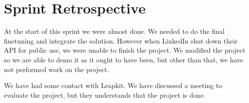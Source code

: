\section{Sprint Retrospective}

At the start of this sprint we were almost done. We needed to do the final
finetuning and integrate the solution. However when LinkedIn shut down
their API for public use, we were unable to finish the project. We
modified the project so we are able to demo it as it ought to have been,
but other than that, we have not performed work on the project.

We have had some contact with Leapkit. We have discussed a meeting to
evaluate the project, but they understands that the project is done. 


